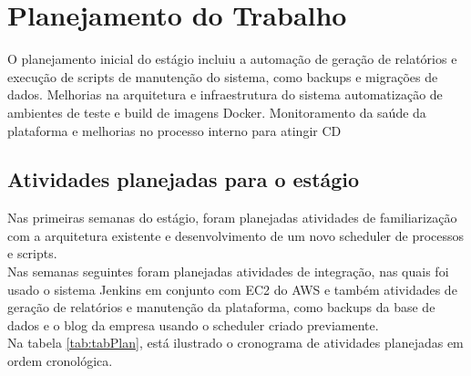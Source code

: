 \chapter{Planejamento do Trabalho}\label{chap:atividadesPlanejadas}

O planejamento inicial do estágio incluiu a automação de geração de relatórios e execução de scripts de manutenção do sistema, como backups e migrações de dados. Melhorias na arquitetura e infraestrutura do sistema automatização de ambientes de teste e build de imagens \gls{Docker}. Monitoramento da saúde da plataforma e melhorias no processo interno para atingir \gls{CD}


\section{Atividades planejadas para o estágio}



Nas primeiras semanas do estágio, foram planejadas atividades de familiarização com a arquitetura existente e desenvolvimento de um novo \gls{scheduler} de processos e scripts.\\

Nas semanas seguintes foram planejadas atividades de integração, nas quais foi usado o sistema \gls{Jenkins} em conjunto com \gls{EC2} do \gls{AWS} e também atividades de geração de relatórios e manutenção da plataforma, como backups da base de dados e o blog da empresa usando o \gls{scheduler} criado previamente.\\

Na tabela \ref{tab:tabPlan}, está ilustrado o cronograma de atividades planejadas em ordem cronológica.\\

